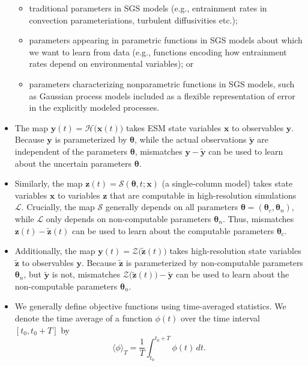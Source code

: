 \documentclass{article}
\renewcommand{\vec}[1]{\boldsymbol{{#1}}}
\begin{document}
\begin{itemize}
\begin{itemize}
            \item traditional parameters in SGS models (e.g., entrainment rates in convection parameteriations, turbulent diffusivities etc.);
            \item parameters appearing in parametric functions in SGS models about which we want to learn from data (e.g., functions encoding how entrainment rates depend on environmental variables); or
            \item parameters characterizing nonparametric functions in SGS models, such as Gaussian process models \citep{Rasmussen06a} included as a flexible representation of error in the explicitly modeled processes. 
        \end{itemize} 
    \item The map $\vec{y}(t)=\mathcal{H}\bigl(\vec{x}(t)\bigr)$ takes ESM state variables $\vec{x}$ to observables $\vec{y}$. Because $\vec{y}$ is parameterized by $\vec{\theta}$, while the actual observations $\vec{\tilde y}$ are independent of the parameters $\vec{\theta}$, mismatches $\vec{y} - \vec{\tilde y}$ can be used to learn about the uncertain parameters $\vec{\theta}$. 
    \item Similarly, the map $\vec{z}(t) = \mathcal{S}(\vec{\theta},t; \vec{x})$ (a single-column model) takes state variables $\vec{x}$ to variables $\vec{z}$ that are computable in high-resolution simulations $\mathcal{L}$. Crucially, the map $\mathcal{S}$ generally depends on all parameters $\vec{\theta}=(\vec{\theta}_c, \vec{\theta}_n)$, while $\mathcal{L}$ only depends on non-computable parameters $\vec{\theta}_n$. Thus, mismatches $\vec{z}(t) - \vec{\tilde z}(t)$ can be used to learn about the computable parameters $\vec{\theta}_c$.
    \item Additionally, the map $\vec{y}(t) = \mathcal{Z}\bigl(\vec{\tilde z}(t)\bigr)$ takes high-resolution state variables $\vec{\tilde z}$ to observables $\vec{y}$. Because $\vec{\tilde z}$ is parameterized by non-computable parameters $\vec{\theta}_n$, but $\vec{\tilde y}$ is not, mismatches $\mathcal{Z}\bigl(\vec{\tilde z}(t)\bigr) - \vec{\tilde y}$ can be used to learn about the non-computable parameters $\vec{\theta}_n$.
    \item We generally define objective functions using time-averaged statistics. We denote the time average of a function $\phi(t)$ over the time interval $[t_0,t_0+T]$ by
    \begin{equation}\label{e:Tavg}
    \langle \phi \rangle_T = \frac{1}{T} \int_{t_0}^{t_0+T} \phi(t) \, dt.
    \end{equation}

\end{itemize}
\end{document}
